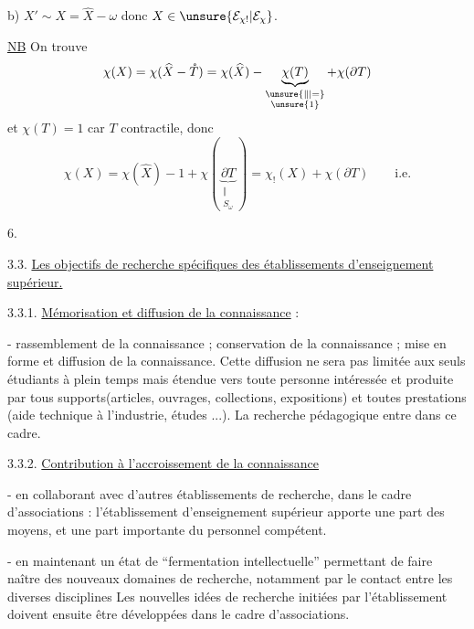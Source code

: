 b) $X'\sim X=\widehat X-\omega$ donc $X\in\unsure{\mathcal E_{\chi!}|\mathcal E_\chi}$.

\uline{NB} On trouve
\[
\chi(X)=\chi(\widehat X-\mathring T)=\chi(\widehat X)-\underbrace{\chi(T)}_{\substack{\unsure{\Vert|=}\\\unsure{1}}}+\chi(\partial T)
\]
et $\chi(T)=1$ car $T$ contractile, donc
\[
\chi(X)=\chi(\widehat X)-1+\chi(\underbrace{\partial T}_{\substack{\Vert\\S_\omega}})=\chi_!(X)+\chi(\partial T)\qquad\text{i.e.}
\]


\begin{flushright}6.\end{flushright}

3.3. \uline{Les objectifs de recherche spécifiques des établissements d'enseignement supérieur.}

3.3.1. \uline{Mémorisation et diffusion de la connaissance} :

- rassemblement de la connaissance ; conservation de la connaissance ; mise en forme et diffusion de la connaissance. Cette diffusion ne sera pas limitée aux seuls étudiants à plein temps mais étendue vers toute personne intéressée et produite par tous supports(articles, ouvrages, collections, expositions) et toutes prestations (aide technique à l'industrie, études ...). La recherche pédagogique entre dans ce cadre.

3.3.2. \uline{Contribution à l'accroissement de la connaissance}

- en collaborant avec d'autres établissements de recherche, dans le cadre d'associations : l'établissement d'enseignement supérieur apporte une part des moyens, et une part importante du personnel compétent.

- en maintenant un état de ``fermentation intellectuelle'' permettant de faire naître des nouveaux domaines de recherche, notamment par le contact entre les diverses disciplines Les nouvelles idées de recherche\inserted{,} initiées par l'établissement\inserted{,} doivent\inserted{,} ensuite être développées dans le cadre d'associations.

